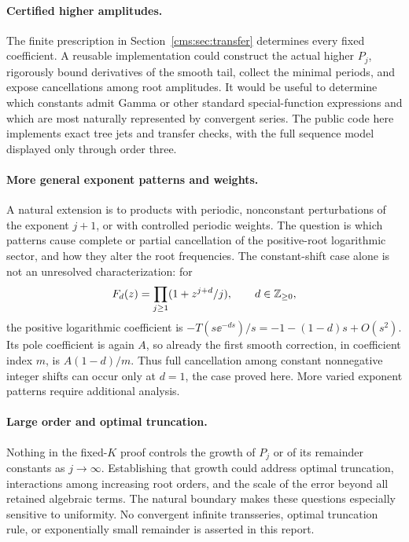 \paragraph{Certified higher amplitudes.}
The finite prescription in Section~\ref{cms:sec:transfer} determines every fixed coefficient. A reusable implementation could construct the actual higher $P_j$, rigorously bound derivatives of the smooth tail, collect the minimal periods, and expose cancellations among root amplitudes. It would be useful to determine which constants admit Gamma or other standard special-function expressions and which are most naturally represented by convergent series. The public code here implements exact tree jets and transfer checks, with the full sequence model displayed only through order three.

\paragraph{More general exponent patterns and weights.}
A natural extension is to products with periodic, nonconstant perturbations of the exponent $j+1$, or with controlled periodic weights. The question is which patterns cause complete or partial cancellation of the positive-root logarithmic sector, and how they alter the root frequencies. The constant-shift case alone is not an unresolved characterization: for
\[
F_d(z)=\prod_{j\geq1}(1+z^{j+d}/j),\qquad d\in\mathbb Z_{\geq0},
\]
the positive logarithmic coefficient is $-T(s\ee^{-ds})/s=-1-(1-d)s+O(s^2)$. Its pole coefficient is again $A$, so already the first smooth correction, in coefficient index $m$, is $A(1-d)/m$. Thus full cancellation among constant nonnegative integer shifts can occur only at $d=1$, the case proved here. More varied exponent patterns require additional analysis.

\paragraph{Large order and optimal truncation.}
Nothing in the fixed-$K$ proof controls the growth of $P_j$ or of its remainder constants as $j\to\infty$. Establishing that growth could address optimal truncation, interactions among increasing root orders, and the scale of the error beyond all retained algebraic terms. The natural boundary makes these questions especially sensitive to uniformity. No convergent infinite transseries, optimal truncation rule, or exponentially small remainder is asserted in this report.

